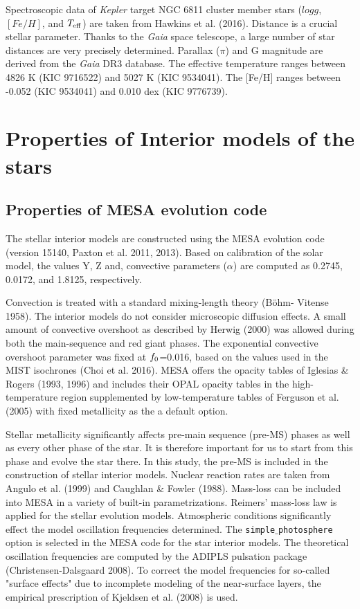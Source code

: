 \documentclass[a4paper,fleqn,usenatbib]{mnras}     %
\begin{document}
{Spectroscopic data of 
 {\emph{Kepler}} target NGC 6811 cluster member stars 
($log g$, $[Fe/H]$, and $T_{\rm eff}$) are taken from Hawkins et al. (2016).
 Distance is a crucial stellar parameter. 
Thanks to the {\emph{Gaia}} space telescope, 
a large number of star distances are very precisely determined.
Parallax ($\pi$) and G magnitude are derived from the \emph{Gaia} DR3 database.
The effective temperature ranges between 4826 K (KIC 9716522) and 5027 K (KIC 9534041). 
The [Fe/H] ranges between 
-0.052 (KIC 9534041) and 0.010 dex (KIC 9776739).

\section{Properties of Interior models of the stars}
\subsection{Properties of {\small {MESA}} evolution code}
The stellar interior models are constructed using 
the {\small {MESA}} evolution code 
(version 15140, Paxton et al. 2011, 2013). 
Based on calibration of the solar model,
the values Y, Z and, 
convective parameters ($\alpha$) are computed as
0.2745, 0.0172, and 1.8125, respectively.

Convection is treated with a standard mixing-length theory (B\"{o}hm- Vitense 1958).
The interior models do not consider
microscopic diffusion effects.
A small amount of convective overshoot as
described by Herwig (2000) was allowed
during both the main-sequence
and red giant phases.
The exponential convective overshoot
parameter was fixed at $f _{\rm 0}$=0.016, 
based on the values used in the MIST isochrones (Choi et al. 2016).
 {\small {MESA}} offers the opacity tables 
of Iglesias \& Rogers (1993, 1996) and
includes their OPAL opacity tables 
in the high-temperature region supplemented 
by low-temperature 
tables of Ferguson et al. (2005) 
with fixed metallicity as the a default option.

Stellar metallicity significantly affects 
pre-main sequence (pre-MS) phases as 
well as every other 
phase of the star. 
 It is therefore important for us 
to start from this phase 
and evolve the star 
there.
In this study, 
the pre-MS is included in the 
construction of stellar interior models. 
Nuclear reaction rates are taken 
from Angulo et al. (1999) and Caughlan \& Fowler (1988).
Mass-loss can be included into {\small {MESA}} in a variety of built-in parametrizations. 
Reimers' mass-loss law is applied for the stellar evolution models.
Atmospheric conditions significantly effect the
model oscillation frequencies determined.
The \texttt{simple$\_$photosphere} option
is selected in the {\small {MESA}}
code for the star interior models.
The theoretical oscillation frequencies 
are computed by 
the {\small {ADIPLS}} pulsation package (Christensen-Dalsgaard 2008).
To correct the model frequencies for so-called 
"surface effects" due to incomplete 
modeling of the near-surface layers, 
the empirical prescription of Kjeldsen et al. (2008) is used.

}
\end{document}

